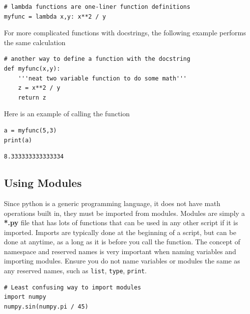 \documentclass[%
oneside,                 %
final,                   %
10pt]{article}
\begin{document}
\begin{Verbatim}[numbers=none,fontsize=\fontsize{9pt}{9pt},baselinestretch=0.95,xleftmargin=2mm]
# lambda functions are one-liner function definitions
myfunc = lambda x,y: x**2 / y
\end{Verbatim}

For more complicated functions with docstrings, the following example performs the same calculation

\begin{Verbatim}[numbers=none,fontsize=\fontsize{9pt}{9pt},baselinestretch=0.95,xleftmargin=2mm]
# another way to define a function with the docstring
def myfunc(x,y):
    '''neat two variable function to do some math'''
    z = x**2 / y
    return z
\end{Verbatim}

Here is an example of calling the function

\begin{Verbatim}[numbers=none,fontsize=\fontsize{9pt}{9pt},baselinestretch=0.95,xleftmargin=2mm]
a = myfunc(5,3)
print(a)
\end{Verbatim}

\begin{Verbatim}[numbers=none,fontsize=\fontsize{9pt}{9pt},baselinestretch=0.95,xleftmargin=2mm]
8.333333333333334
\end{Verbatim}

\subsection{Using Modules}

Since python is a generic programming language, it does not have math operations built in, they must be imported from modules. Modules are simply a \textbf{*.py} file that has lots of functions that can be used in any other script if it is imported. Imports are typically done at the beginning of a script, but can be done at anytime, as a long as it is before you call the function. The concept of namespace and reserved names is very important when naming variables and importing modules. Ensure you do not name variables or modules the same as any reserved names, such as \texttt{list}, \texttt{type}, \texttt{print}.



\begin{Verbatim}[numbers=none,fontsize=\fontsize{9pt}{9pt},baselinestretch=0.95,xleftmargin=2mm]
# Least confusing way to import modules
import numpy
numpy.sin(numpy.pi / 45)
\end{Verbatim}
\end{document}
